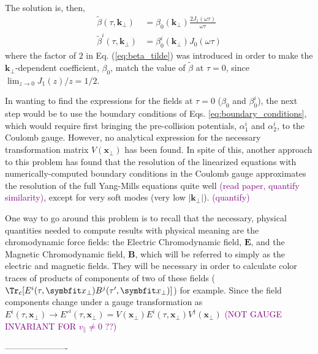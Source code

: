 The solution is, then,
\begin{subequations}
	\begin{align}
		\tilde{\beta} (\tau, \mathbf{k}_\perp) &= \beta_0 (\mathbf{k}_\perp) \frac{2 J_1(\omega \tau)}{\omega \tau} \label{eq:beta_tilde}\\
		\tilde{\beta}^i (\tau, \mathbf{k}_\perp) &= \beta^i_0 (\mathbf{k}_\perp) J_0(\omega \tau)
	\end{align}
\end{subequations}
where the factor of $2$ in Eq. (\ref{eq:beta_tilde}) was introduced in order to make the $\mathbf{k}_\perp$-dependent coefficient, $\beta_0$, match the value of $\tilde{\beta}$ at $\tau=0$, since $\lim_{z \to 0} J_1(z)/z=1/2$. \cite{arfken2013}

In wanting to find the expressions for the fields at $\tau = 0$ ($\beta_0$ and $\beta^i_0$), the next step would be to use the boundary conditions of Eqs. \ref{eq:boundary_conditions}, which would require first bringing the pre-collision potentials, $\alpha^i_1$ and $\alpha^i_2$, to the Coulomb gauge. However, no analytical expression for the necessary transformation matrix $V(\mathbf{x}_\perp)$ has been found. In spite of this, another approach to this problem has found that the resolution of the linearized equations with numerically-computed boundary conditions in the Coulomb gauge approximates the resolution of the full Yang-Mills equations quite well \cite{} \textcolor{purple}{(read paper, quantify similarity)}, except for very soft modes (very low $|\mathbf{k}_\perp|$). \textcolor{purple}{(quantify)}

One way to go around this problem is to recall that the necessary, physical quantities needed to compute results with physical meaning are the chromodynamic force fields: the Electric Chromodynamic field, $\mathbf{E}$, and the Magnetic Chromodynamic field, $\mathbf{B}$, which will be referred to simply as the electric and magnetic fields. They will be necessary in order to calculate color traces of products of components of two of these fields ($\Tr_c [E^i(\tau, \mathbf{x}_\perp) B^j(\tau', \mathbf{x}_\perp) ]$) for example. Since the field components change under a gauge transformation as $E^i (\tau, \mathbf{x}_\perp) \to E'^i(\tau, \mathbf{x}_\perp) = V(\mathbf{x}_\perp) E^i(\tau, \mathbf{x}_\perp) V^\dagger(\mathbf{x}_\perp)$ \textcolor{purple}{(NOT GAUGE INVARIANT FOR $v_\parallel \neq 0$ ??)}

----------------------

